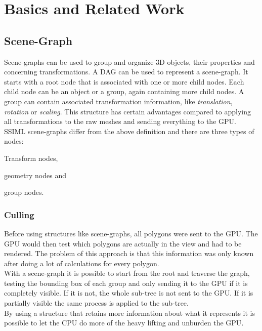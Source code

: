 
\section{Basics and Related Work}
\label{basics-and-related-work}

\subsection{Scene-Graph}\label{scene-graph}

Scene-graphs can be used to group and organize \gls{3D} objects, their properties and
concerning transformations. A \gls{DAG} can be used to represent a scene-graph.
It starts with a root node that is associated with one or more child nodes. Each
child node can be an object or a group, again containing more child nodes. A group can
contain associated transformation information, like \emph{translation},
\emph{rotation} or \emph{scaling}. This structure has certain advantages
compared to applying all transformations to the raw meshes and sending
everything to the \gls{GPU}. \cite{realityprime} \gls{SSIML} \cite{Lenk:2012:MID:2338714.2338742} scene-graphs differ from the
above definition and there are three types of nodes:

\begin{itemize*}
  \item Transform nodes,
  \item geometry nodes and
  \item group nodes.
\end{itemize*}

\subsubsection{Culling}\label{culling}

Before using structures like scene-graphs, all polygons were sent to
the \gls{GPU}. The \gls{GPU} would then test which polygons are actually in the
view and had to be rendered. The problem of this approach is
that this information was only known after doing a lot of calculations
for every polygon.\\
With a scene-graph it is possible to start from the root and traverse the
graph, testing the bounding box of each group and only sending it to the
\gls{GPU} if it is completely visible. If it is not, the whole sub-tree is not
sent to the \gls{GPU}. If it is partially visible the same process is applied
to the sub-tree.\\
By using a structure that retains more information about what it
represents it is possible to let the CPU do more of the heavy
lifting and unburden the \gls{GPU}.

